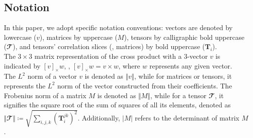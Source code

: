 \subsection{Notation}
In this paper, we adopt specific notation conventions: vectors are denoted by lowercase (\( v \)), matrices by uppercase (\( M \)), tensors by calligraphic bold uppercase (\( \mathbfcal{T} \)), and tensors' correlation slices (\ie, matrices) by bold uppercase (\( \bm{T}_i \)).\\

The \( 3 \times 3 \) matrix representation of the cross product with a 3-vector $v$ is indicated by \( [v]_{\times}w \), \ie, \( [v]_{\times}w = v \times w \), where \( w \) represents any given vector.\\

The \( L^2 \) norm of a vector \( v \) is denoted as \( \Vert v \Vert \), while for matrices or tensors, it represents the \( L^2 \) norm of the vector constructed from their coefficients. The Frobenius norm of a matrix \( M \) is denoted as \( \Vert M \Vert \), while for a tensor \( \mathbfcal{T} \), it signifies the square root of the sum of squares of all its elements, denoted as \( \Vert \mathbfcal{T} \Vert \coloneqq \sqrt{\sum_{i,j,k} (\bm{T}_{i}^{jk})^2} \). Additionally, \( \vert M \vert \) refers to the determinant of matrix \( M \).

